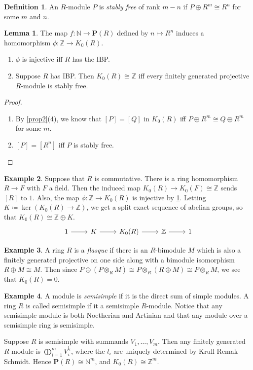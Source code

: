 \documentclass[10pt,letterpaper,cm]{nupset}
\theoremstyle{definition}
\newtheorem{definition}{Definition}
\newtheorem{exmp}[definition]{Example}
\theoremstyle{theorem}
\newtheorem{lemma}[theorem]{Lemma}
\theoremstyle{remark}
\newcommand{\N}{\mathbb N}
\renewcommand{\P}{\mathbf P}
\newcommand{\Z}{\mathbb Z}
\newcommand{\1}{\mathbf{1}}
\newcommand{\0}{\vec 0}
\begin{document}
\begin{definition}
An $R$-module $P$ is \textit{stably free} of rank $m-n$ if $P \oplus R^m \cong R^n$ for some $m$ and $n$.
\end{definition}

\begin{lemma}\label{L4}
The map $f: \N \to \P(R)$ defined by $n \mapsto R^n$ induces a homomorphism $\phi : \Z \to K_0(R)$.
\begin{enumerate}
\item $\phi$ is injective iff $R$ has the IBP.
\item Suppose $R$ has IBP. Then $K_0(R) \cong \Z$ iff every finitely generated projective $R$-module is stably free.
\end{enumerate}
\end{lemma}
\begin{proof} $ $
\begin{enumerate}
\item By \cref{prop2}(4), we know that $[P] = [Q]$ in $K_0(R)$ iff $P\oplus R^m \cong Q\oplus R^m$ for some $m$. 
\item $[P]= [R^n]$ iff $P$ is stably free.
\end{enumerate}
\end{proof}


\begin{exmp}
Suppose that $R$ is commutative. There is a ring homomorphism $R\to F$ with $F$ a field. Then the induced map $K_0(R) \to K_0(F) \cong \Z$ sends $[R]$ to $1$. Also, the map $\phi : \Z \to K_0(R)$ is injective by \cref{L4}. Letting $K\coloneqq \ker(K_0(R) \to \Z)$, we get a split exact sequence of abelian groups, so that $K_0(R) \cong \Z \oplus K$.
\[
\begin{tikzcd}
1 \arrow[r] & K \arrow[r] & K_0(R) \arrow[r] & \mathbb Z \arrow[r] & 1
\end{tikzcd}
\]
\end{exmp}

\begin{exmp}
A ring $R$ is a \textit{flasque} if there is an $R$-bimodule $M$ which is also a finitely generated projective on one side along with a bimodule isomorphism $R\oplus M \cong M$. Then since $P \oplus (P \otimes_R M) \cong P \otimes_R (R \oplus M) \cong P \otimes_R M$, we see that $K_0(R) =0$.
\end{exmp}

\begin{exmp}
A module is \textit{semisimple} if it is the direct sum of simple modules. A ring $R$ is called semisimple if it a semisimple $R$-module. Notice that any semisimple module is both Noetherian and Artinian and that any module over a semisimple ring is semisimple. 
\medskip

 Suppose $R$ is semisimple with summands $V_1, \ldots, V_m$. Then any finitely generated $R$-module is $\bigoplus_{i=1}^m V_i^{l_i}$, where the $l_i$ are uniquely determined by Krull-Remak-Schmidt. Hence $\P(R) \cong \N^m$, and $K_0(R) \cong \Z^m$.
\end{exmp}
\end{document}
